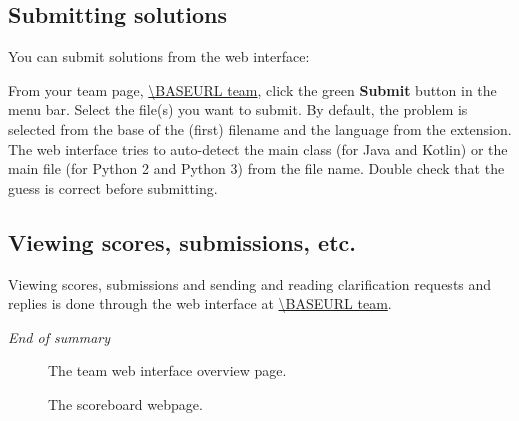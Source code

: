 \subsection*{Submitting solutions}

You can submit solutions%
from the web interface:
\begin{description}[\breaklabel\setlabelstyle{\bfseries}]
\item[Web interface]
From your team page, \url{\BASEURL team}, click the green \textbf{Submit}
button in the menu bar. Select the file(s) you want to submit.
By default, the problem is selected from the base of the (first)
filename and the language from the extension. The web interface tries
to auto-detect the main class (for Java and Kotlin) or the main file (for
Python 2 and Python 3) from the file name. Double check that the guess is
correct before submitting.
\end{description}

\subsection*{Viewing scores, submissions, etc.}

Viewing scores, submissions and sending and reading clarification
requests and replies is done through the web interface at
\url{\BASEURL team}.

\emph{End of summary}

\begin{figure}[p]
  \centering
  \caption{The team web interface overview page.}
  \label{fig:team-overview}
\end{figure}

\begin{figure}[p]
  \centering
  \caption{The scoreboard webpage.}
  \label{fig:team-scoreboard}
\end{figure}

